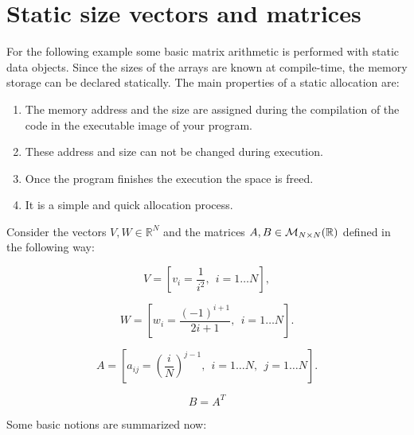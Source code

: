 \newpage 
\section{Static size vectors and matrices} 

For the following example some basic matrix arithmetic is performed with static data objects. 
Since the sizes of the arrays are known at compile-time, the memory storage can be declared statically. 
The main properties of a static allocation are:

\begin{enumerate}
    \item The memory address and the size are assigned during the compilation of the code in the executable image of your program.
    \item These address and size can not be changed during execution.
    \item Once the program finishes the execution the space is freed.
    \item It is a simple and quick allocation process.
\end{enumerate}


Consider the vectors $V, W \in \mathbb{R}^N$ and the matrices  $ A, B \in { \cal{M}}_{N \times N} (\mathbb{R})$ defined in the following way: 

$$
V = \left[ v_i =\frac{1}{i^2}, \ \ i = 1 \ldots  N \right],
$$

$$
W = \left[ w_i = \frac{(-1)^{i+1}}{2i+1}, \ \ i = 1 \ldots  N \right].
$$

$$
A = \left[ a_{ij} = \left( \frac{i}{N} \right)^{j-1}, \ \ i = 1 \ldots  N, \ \ j = 1 \ldots  N \right].
$$

$$
B = A^T
$$






Some basic notions are summarized now: 

